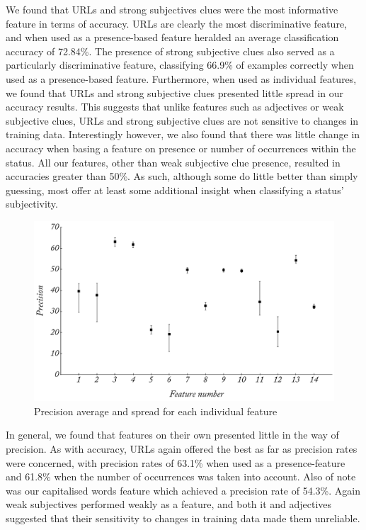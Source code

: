 We found that URLs and strong subjectives clues were the most informative feature in terms of accuracy. URLs are clearly the most discriminative feature, and when used as a presence-based feature heralded an average classification accuracy of 72.84\%. The presence of strong subjective clues also served as a particularly discriminative feature, classifying 66.9\% of examples correctly when used as a presence-based feature. Furthermore, when used as individual features, we found that URLs and strong subjective clues presented little spread in our accuracy results. This suggests that unlike features such as adjectives or weak subjective clues, URLs and strong subjective clues are not sensitive to changes in training data. Interestingly however, we also found that there was little change in accuracy when basing a feature on presence or number of occurrences within the status. All our features, other than weak subjective clue presence, resulted in accuracies greater than 50\%. As such, although some do little better than simply guessing, most offer at least some additional insight when classifying a status' subjectivity.

\begin{figure}
	\caption{Precision average and spread for each individual feature}
	\label{fig:subj_p}
	\centering
		\includegraphics[width=1.0\textwidth]{graphs/subj_p.pdf}
\end{figure}

In general, we found that features on their own presented little in the way of precision. As with accuracy, URLs again offered the best as far as precision rates were concerned, with precision rates of 63.1\% when used as a presence-feature and 61.8\% when the number of occurrences was taken into account. Also of note was our capitalised words feature which achieved a precision rate of 54.3\%. Again weak subjectives performed weakly as a feature, and both it and adjectives suggested that their sensitivity to changes in training data made them unreliable.

